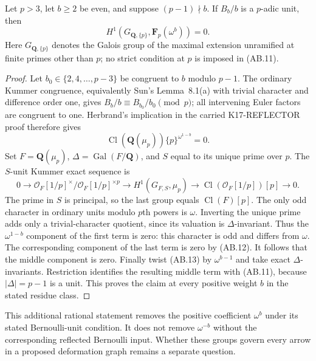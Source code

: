 \begin{lemma}
Let $p>3$, let $b\ge2$ be even, and suppose
$(p-1)\nmid b$.  If $B_b/b$ is a $p$-adic unit, then
\[
              H^1(G_{\mathbf Q,\{p\}},
                         \mathbf F_p(\omega^b))=0.       \tag{AB.11}
\]
Here $G_{\mathbf Q,\{p\}}$ denotes the Galois group of the
maximal extension unramified at finite primes other than
$p$; no strict condition at $p$ is imposed in (AB.11).
\end{lemma}
\begin{proof}
Let $b_0\in\{2,4,\ldots,p-3\}$ be congruent to $b$
modulo $p-1$.  The ordinary Kummer congruence, equivalently
Sun's Lemma~8.1(a) with trivial character and difference
order one, gives $B_b/b\equiv B_{b_0}/b_0\pmod p$;
all intervening Euler factors are congruent to one.
Herbrand's implication in the carried K17-REFLECTOR proof
therefore gives
\[
 \operatorname{Cl}(\mathbf Q(\mu_p))\{p\}^{\omega^{1-b}}=0.
                                                               \tag{AB.12}
\]
Set $F=\mathbf Q(\mu_p)$, $\Delta=\operatorname{Gal}(F/\mathbf Q)$,
and $S$ equal to its unique prime over $p$.  The $S$-unit
Kummer exact sequence is
\[
 0\longrightarrow\mathcal O_F[1/p]^\times/
                    \mathcal O_F[1/p]^{\times p}
 \longrightarrow H^1(G_{F,S},\mu_p)
 \longrightarrow\operatorname{Cl}(\mathcal O_F[1/p])[p]
 \longrightarrow0.                                      \tag{AB.13}
\]
The prime in $S$ is principal, so the last group equals
$\operatorname{Cl}(F)[p]$.  The only odd character in
ordinary units modulo $p$th powers is $\omega$.
Inverting the unique prime adds only a trivial-character
quotient, since its valuation is $\Delta$-invariant.
Thus the $\omega^{1-b}$ component of the first term is
zero: this character is odd and differs from $\omega$.
The corresponding component of the last term is zero
by (AB.12).  It follows that the middle component is zero.
Finally twist (AB.13) by $\omega^{b-1}$ and take exact
$\Delta$-invariants.  Restriction identifies the resulting
middle term with (AB.11), because $|\Delta|=p-1$ is a unit.
This proves the claim at every positive weight $b$ in the
stated residue class.
\end{proof}

This additional rational statement removes the positive
coefficient $\omega^b$ under its stated Bernoulli-unit
condition.  It does not remove $\omega^{-b}$ without
the corresponding reflected Bernoulli input.  Whether
these groups govern every arrow in a proposed deformation
graph remains a separate question.
